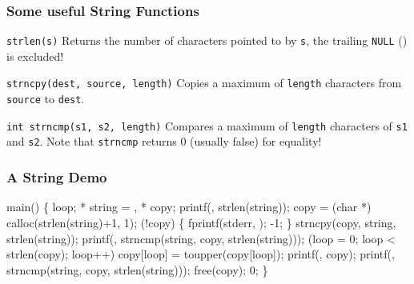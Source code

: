 \documentclass[smaller,handout,table]{beamer}
\begin{document}
\begin{frame}
\frametitle{Some useful String Functions}
\begin{block}{\tt strlen(s)}
Returns the number of characters pointed to by {\tt s}, the trailing {\tt NULL} ({\tt {}}) is excluded!
\end{block}
\begin{block}{\tt strncpy(dest, source, length)}
Copies a maximum of {\tt length} characters from {\tt source} to {\tt dest}.
\end{block}
\begin{block}{\tt int strncmp(s1, s2, length)}
Compares a maximum of {\tt length} characters of {\tt s1} and {\tt s2}. Note that {\tt strncmp} returns 0 (usually false) for equality!
\end{block}
\end{frame}

\begin{frame}[fragile]
\frametitle{A String Demo}
\vspace{-0.2in}
\begin{semiverbatim}
\tiny
\kr\kl{} 
\kl{} 
\kl{} 
\kl{} 
\kl
\kl{} main()
\kl\{
\kl   {} loop;
\kl   {} * string = , * copy;
\kl   printf(, strlen(string));
\kl   copy = (char *) calloc(strlen(string)+1, 1);
\kl   {} (!copy)
\kl   \{
\kl      fprintf(stderr, );
\kl      {} -1;
\kl   \}
\kl   
\kl   strncpy(copy, string, strlen(string));
\kl   printf(,
\kl         strncmp(string, copy, strlen(string)));
\kl         
\kl   {} (loop = 0; loop < strlen(copy); loop++)
\kl      copy[loop] = toupper(copy[loop]);
\kl      
\kl   printf(, copy);
\kl   printf(,
\kl         strncmp(string, copy, strlen(string)));
\kl         
\kl   free(copy);
\kl   {} 0;
\kl\}
\end{semiverbatim}
\end{frame}
\end{document}
